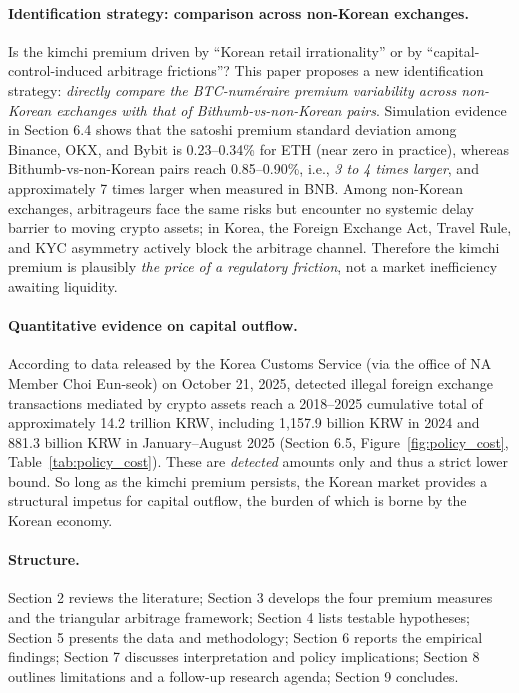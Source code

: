 \documentclass[11pt,a4paper]{article}
\begin{document}
\paragraph{Identification strategy: comparison across non-Korean exchanges.}
Is the kimchi premium driven by ``Korean retail irrationality'' or by ``capital-control-induced
arbitrage frictions''? This paper proposes a new identification strategy: \emph{directly compare the
BTC-num\'eraire premium variability across non-Korean exchanges with that of Bithumb-vs-non-Korean
pairs}. Simulation evidence in Section 6.4 shows that the satoshi premium standard deviation among
Binance, OKX, and Bybit is 0.23--0.34\% for ETH (near zero in practice), whereas Bithumb-vs-non-Korean
pairs reach 0.85--0.90\%, i.e., \emph{3 to 4 times larger}, and approximately 7 times larger when
measured in BNB. Among non-Korean exchanges, arbitrageurs face the same risks but encounter no
systemic delay barrier to moving crypto assets; in Korea, the Foreign Exchange Act, Travel Rule, and
KYC asymmetry actively block the arbitrage channel. Therefore the kimchi premium is plausibly
\emph{the price of a regulatory friction}, not a market inefficiency awaiting liquidity.

\paragraph{Quantitative evidence on capital outflow.}
According to data released by the Korea Customs Service (via the office of NA Member Choi Eun-seok)
on October 21, 2025, detected illegal foreign exchange transactions mediated by crypto assets reach
a 2018--2025 cumulative total of approximately 14.2 trillion KRW, including 1{,}157.9 billion KRW
in 2024 and 881.3 billion KRW in January--August 2025 (Section 6.5, Figure~\ref{fig:policy_cost},
Table~\ref{tab:policy_cost}). These are \emph{detected} amounts only and thus a strict lower bound.
So long as the kimchi premium persists, the Korean market provides a structural impetus for
capital outflow, the burden of which is borne by the Korean economy.

\paragraph{Structure.} Section 2 reviews the literature; Section 3 develops the four premium measures
and the triangular arbitrage framework; Section 4 lists testable hypotheses; Section 5 presents the
data and methodology; Section 6 reports the empirical findings; Section 7 discusses interpretation and
policy implications; Section 8 outlines limitations and a follow-up research agenda; Section 9
concludes.
\end{document}
